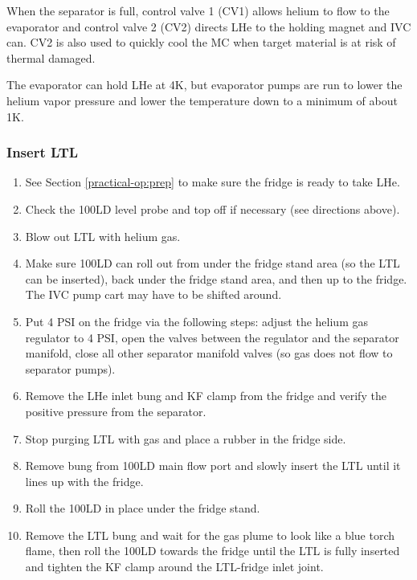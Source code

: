 When the separator is full, control valve 1 (CV1) allows helium to flow to the evaporator and control valve 2 (CV2) directs LHe to the holding magnet and IVC can.  CV2 is also used to quickly cool the MC when target material is at risk of thermal damaged.

The evaporator can hold LHe at 4K, but evaporator pumps are run to lower the helium vapor pressure and lower the temperature down to a minimum of about 1K.

\subsubsection{Insert LTL}
\begin{enumerate}
 \item See Section \ref{practical-op:prep} to make sure the fridge is ready to take LHe.
 \item Check the 100LD level probe and top off if necessary (see directions above).
 \item Blow out LTL with helium gas.
 \item Make sure 100LD can roll out from under the fridge stand area (so the LTL can be inserted), back under the fridge stand area, and then up to the fridge.  The IVC pump cart may have to be shifted around.
 \item Put 4 PSI on the fridge via the following steps: adjust the helium gas regulator to 4 PSI, open the valves between the regulator and the separator manifold, close all other separator manifold valves (so gas does not flow to separator pumps).
 \item Remove the LHe inlet bung and KF clamp from the fridge and verify the positive pressure from the separator.
 \item Stop purging LTL with gas and place a rubber in the fridge side.
 \item Remove bung from 100LD main flow port and slowly insert the LTL until it lines up with the fridge.
 \item Roll the 100LD in place under the fridge stand.
 \item Remove the LTL bung and wait for the gas plume to look like a blue torch flame, then roll the 100LD towards the fridge until the LTL is fully inserted and tighten the KF clamp around the LTL-fridge inlet joint.
 \end{enumerate}
 
